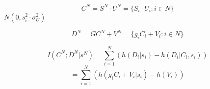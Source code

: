 \begin{equation}
C^N= S^N \cdot U^N = \{ S_i\cdot U_i : i \in N \}
\end{equation}
$N(0, s_i^2 \cdot \sigma^2_U)$

\begin{equation}
D^N= GC^N + V^N = \{ g_i C_i + V_i : i \in N \}
\end{equation}

\begin{equation}
I(C^N; D^N|s^N)  = \sum_{i=1}^N{(h(D_i|s_i)-h(D_i|C_i,s_i))}
\end{equation}
\begin{equation}
= \sum_{i=1}^N{(h( g_i C_i + V_i|s_i)-h(V_i))}
\end{equation}